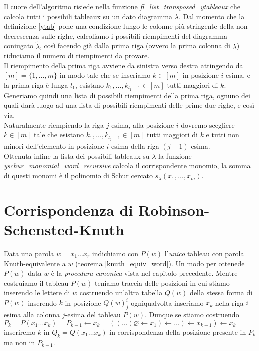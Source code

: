 Il cuore dell'algoritmo risiede nella funzione
\emph{fl\_list\_transposed\_ytableaux} che calcola tutti i
possibili tableaux su un dato diagramma $\lambda$. Dal momento che la
definizione \ref{ytab} pone una condizione
lungo le colonne pi\`u stringente della non decrescenza sulle
righe, calcoliamo i possibili riempimenti del diagramma coniugato
$\tilde{\lambda}$, cos\`i facendo gi\`a dalla prima riga (ovvero la
prima colonna di $\lambda$) riduciamo il numero di riempimenti da
provare.\\
Il riempimento della prima riga avviene da sinistra verso destra
attingendo da $[m]=\{1,\ldots, m\}$ in modo tale che se inseriamo $k \in
[m]$ in posizione $i$-esima, e la prima riga \`e lunga $l_1$, esistano
$k_1,\ldots,k_{l_1-1} \in [m]$ tutti maggiori di $k$. Generiamo quindi
una lista di possibili riempimenti della prima riga, ognuno dei quali
dar\`a luogo ad una lista di possibili riempimenti delle prime due
righe, e cos\`i via.\\ 
Naturalmente riempiendo la riga $j$-esima, alla
posizione $i$ dovremo scegliere $k \in [m]$ tale che esistano
$k_1,\ldots,k_{l_j-1} \in [m]$ tutti maggiori di $k$ e tutti non
minori dell'elemento in posizione $i$-esima della riga
$(j-1)$-esima.\\
Ottenuta infine la lista dei possibili tableaux su $\lambda$ la
funzione \emph{yschur\_monomial\_word\_recursive} calcola il
corrispondente monomio, la somma di questi monomi \`e il polinomio di
Schur cercato $s_\lambda(x_1,\ldots,x_m)$.

\section{Corrispondenza di Robinson-Schensted-Knuth}
Data una parola $w=x_1\ldots x_r$ indichiamo con $P(w)$ l'\emph{unico} tableau con
parola Knuth-equivalente a $w$ (teorema \ref{knuth_equiv_word}). Un
modo per ottenede $P(w)$ data $w$ \`e la \emph{procedura canonica}
vista nel capitolo precedente. Mentre costruiamo il tableau $P(w)$
teniamo traccia delle posizioni in cui stiamo inserendo le lettere di
$w$ costruendo un'altra tabella $Q(w)$ della stessa forma di $P(w)$
inserendo $k$ in posizione $Q(w)^i_j$ ogniqualvolta inseriamo $x_k$
nella riga $i$-esima alla colonna $j$-esima del tableau $P(w)$. Dunque
se stiamo costruendo $P_k=P(x_1\ldots x_k)=P_{k-1} \gets x_k =
((\ldots (\varnothing \gets x_1) \gets \ldots ) \gets x_{k-1} ) \gets
x_k$ inseriremo $k$ in $Q_k=Q(x_1 \ldots x_k)$ in corrispondenza della posizione
presente in $P_k$ ma non in $P_{k-1}$.

